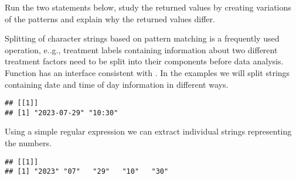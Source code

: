 \documentclass[krantz2]{krantz}\usepackage{knitr}
\begin{document}
\begin{playground}
Run the two statements below, study the returned values by creating variations of the patterns and explain why the returned values differ.

\begin{knitrout}\footnotesize
{}\color{fgcolor}\begin{kframe}
\begin{alltt}
\hlstd{(} \hlstd{=} \hlstd{,}
      \hlstd{=} \hlstd{,}
      \hlstd{=} \hlstd{(}\hlstd{,} \hlstd{,} \hlstd{))}
\hlstd{(} \hlstd{=} \hlstd{,}
      \hlstd{=} \hlstd{,}
      \hlstd{=} \hlstd{(}\hlstd{,} \hlstd{,} \hlstd{))}
\end{alltt}
\end{kframe}
\end{knitrout}
\end{playground}

Splitting of character strings based on pattern matching is a frequently used operation, e..g., treatment labels containing information about two different treatment factors need to be split into their components before data analysis. Function  has an interface consistent with . In the examples we will split strings containing date and time of day information in different ways.

\begin{knitrout}\footnotesize
{}\color{fgcolor}\begin{kframe}
\begin{alltt}
\hlstd{(} \hlstd{=} \hlstd{,}  \hlstd{=} \hlstd{)}
\end{alltt}
\begin{verbatim}
## [[1]]
## [1] "2023-07-29" "10:30"
\end{verbatim}
\end{kframe}
\end{knitrout}

Using a simple regular expression we can extract individual strings representing the numbers.

\begin{knitrout}\footnotesize
{}\color{fgcolor}\begin{kframe}
\begin{alltt}
\hlstd{(} \hlstd{=} \hlstd{,}  \hlstd{=} \hlstd{)}
\end{alltt}
\begin{verbatim}
## [[1]]
## [1] "2023" "07"   "29"   "10"   "30"
\end{verbatim}
\end{kframe}
\end{knitrout}
\end{document}
